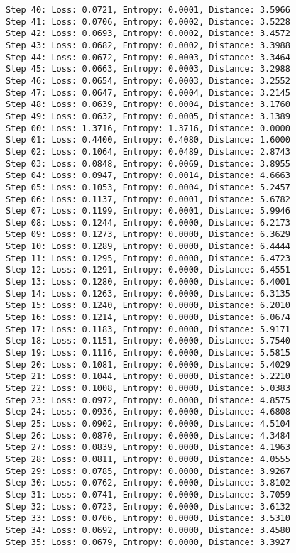 \documentclass[11pt]{article}
\begin{document}
\begin{Verbatim}[commandchars=\\\{\}]
Step 40: Loss: 0.0721, Entropy: 0.0001, Distance: 3.5966
Step 41: Loss: 0.0706, Entropy: 0.0002, Distance: 3.5228
Step 42: Loss: 0.0693, Entropy: 0.0002, Distance: 3.4572
Step 43: Loss: 0.0682, Entropy: 0.0002, Distance: 3.3988
Step 44: Loss: 0.0672, Entropy: 0.0003, Distance: 3.3464
Step 45: Loss: 0.0663, Entropy: 0.0003, Distance: 3.2988
Step 46: Loss: 0.0654, Entropy: 0.0003, Distance: 3.2552
Step 47: Loss: 0.0647, Entropy: 0.0004, Distance: 3.2145
Step 48: Loss: 0.0639, Entropy: 0.0004, Distance: 3.1760
Step 49: Loss: 0.0632, Entropy: 0.0005, Distance: 3.1389
Step 00: Loss: 1.3716, Entropy: 1.3716, Distance: 0.0000
Step 01: Loss: 0.4400, Entropy: 0.4080, Distance: 1.6000
Step 02: Loss: 0.1064, Entropy: 0.0489, Distance: 2.8743
Step 03: Loss: 0.0848, Entropy: 0.0069, Distance: 3.8955
Step 04: Loss: 0.0947, Entropy: 0.0014, Distance: 4.6663
Step 05: Loss: 0.1053, Entropy: 0.0004, Distance: 5.2457
Step 06: Loss: 0.1137, Entropy: 0.0001, Distance: 5.6782
Step 07: Loss: 0.1199, Entropy: 0.0001, Distance: 5.9946
Step 08: Loss: 0.1244, Entropy: 0.0000, Distance: 6.2173
Step 09: Loss: 0.1273, Entropy: 0.0000, Distance: 6.3629
Step 10: Loss: 0.1289, Entropy: 0.0000, Distance: 6.4444
Step 11: Loss: 0.1295, Entropy: 0.0000, Distance: 6.4723
Step 12: Loss: 0.1291, Entropy: 0.0000, Distance: 6.4551
Step 13: Loss: 0.1280, Entropy: 0.0000, Distance: 6.4001
Step 14: Loss: 0.1263, Entropy: 0.0000, Distance: 6.3135
Step 15: Loss: 0.1240, Entropy: 0.0000, Distance: 6.2010
Step 16: Loss: 0.1214, Entropy: 0.0000, Distance: 6.0674
Step 17: Loss: 0.1183, Entropy: 0.0000, Distance: 5.9171
Step 18: Loss: 0.1151, Entropy: 0.0000, Distance: 5.7540
Step 19: Loss: 0.1116, Entropy: 0.0000, Distance: 5.5815
Step 20: Loss: 0.1081, Entropy: 0.0000, Distance: 5.4029
Step 21: Loss: 0.1044, Entropy: 0.0000, Distance: 5.2210
Step 22: Loss: 0.1008, Entropy: 0.0000, Distance: 5.0383
Step 23: Loss: 0.0972, Entropy: 0.0000, Distance: 4.8575
Step 24: Loss: 0.0936, Entropy: 0.0000, Distance: 4.6808
Step 25: Loss: 0.0902, Entropy: 0.0000, Distance: 4.5104
Step 26: Loss: 0.0870, Entropy: 0.0000, Distance: 4.3484
Step 27: Loss: 0.0839, Entropy: 0.0000, Distance: 4.1963
Step 28: Loss: 0.0811, Entropy: 0.0000, Distance: 4.0555
Step 29: Loss: 0.0785, Entropy: 0.0000, Distance: 3.9267
Step 30: Loss: 0.0762, Entropy: 0.0000, Distance: 3.8102
Step 31: Loss: 0.0741, Entropy: 0.0000, Distance: 3.7059
Step 32: Loss: 0.0723, Entropy: 0.0000, Distance: 3.6132
Step 33: Loss: 0.0706, Entropy: 0.0000, Distance: 3.5310
Step 34: Loss: 0.0692, Entropy: 0.0000, Distance: 3.4580
Step 35: Loss: 0.0679, Entropy: 0.0000, Distance: 3.3927

\end{Verbatim}
\end{document}
